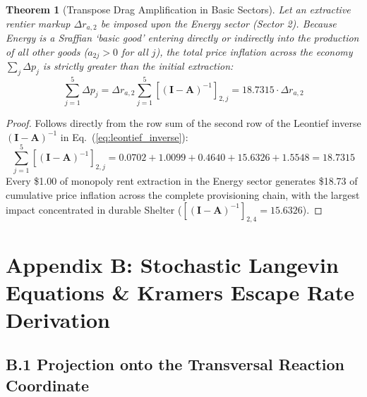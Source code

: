 \documentclass[preprint,12pt,authoryear]{elsarticle}
\newtheorem{theorem}{Theorem}
\theoremstyle{definition}
\begin{document}
\begin{theorem}[Transpose Drag Amplification in Basic Sectors]
Let an extractive rentier markup $\Delta r_{a,2}$ be imposed upon the Energy sector (Sector 2). Because Energy is a Sraffian `basic good' entering directly or indirectly into the production of all other goods ($a_{2j} > 0$ for all $j$), the total price inflation across the economy $\sum_j \Delta p_j$ is strictly greater than the initial extraction:
\begin{equation}
\sum_{j=1}^5 \Delta p_j = \Delta r_{a,2} \sum_{j=1}^5 [(\mathbf{I} - \mathbf{A})^{-1}]_{2, j} = 18.7315 \cdot \Delta r_{a,2} \label{eq:transpose_sum}
\end{equation}
\end{theorem}

\begin{proof}
Follows directly from the row sum of the second row of the Leontief inverse $(\mathbf{I} - \mathbf{A})^{-1}$ in Eq.~(\ref{eq:leontief_inverse}):
$$\sum_{j=1}^5 [(\mathbf{I} - \mathbf{A})^{-1}]_{2, j} = 0.0702 + 1.0099 + 0.4640 + 15.6326 + 1.5548 = 18.7315$$
Every \$1.00 of monopoly rent extraction in the Energy sector generates \$18.73 of cumulative price inflation across the complete provisioning chain, with the largest impact concentrated in durable Shelter ($[(\mathbf{I} - \mathbf{A})^{-1}]_{2,4} = 15.6326$).
\end{proof}

\section*{Appendix B: Stochastic Langevin Equations \& Kramers Escape Rate Derivation}

\subsection*{B.1 Projection onto the Transversal Reaction Coordinate}
\end{document}
